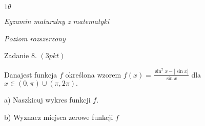 \documentclass[a4paper,12pt]{article}
\begin{document}
$ 1\theta$

{\it Egzamin maturalny z matematyki}

{\it Poziom rozszerzony}

Zadanie 8. $(3pkt)$

Danajest funkcja $f$ określona wzorem $f(x)=\displaystyle \frac{\sin^{2}x-|\sin x|}{\sin x}$ dla $x\in(0,\pi)\cup(\pi,2\pi).$

a) Naszkicuj wykres funkcji $f.$

b) Wyznacz miejsca zerowe funkcji $f$
\end{document}
